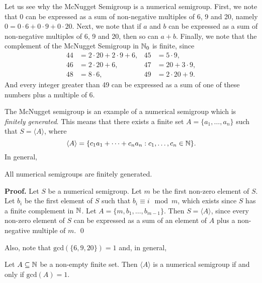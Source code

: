 Let us see why the McNugget Semigroup is a numerical semigroup. First, we note that $0$ can be expressed as a sum of non-negative multiples of 6, 9 and 20, namely $0 = 0 \cdot 6 + 0 \cdot 9 + 0 \cdot 20$. Next, we note that if $a$ and $b$ can be expressed as a sum of non-negative multiples of 6, 9 and 20, then so can $a + b$. Finally, we note that the complement of the McNugget Semigroup in $\mathbb{N}_0$ is finite, since 
\begin{align*}
    44 &= 2 \cdot 20 + 2 \cdot 9 + 6, &45 &= 5 \cdot 9,\\
    46 &= 2 \cdot 20 + 6, &47 &= 20 + 3 \cdot 9,\\
    48 &= 8 \cdot 6, & 49&= 2 \cdot 20 + 9. 
\end{align*}
And every integer greater than 49 can be expressed as a sum of one of these numbers plus a multiple of 6. \par
The McNugget semigroup is an example of a numerical semigroup which is \textit{finitely generated}. This means that there exists a finite set $A = \{a_1, \ldots, a_n\}$ such that $S = \langle A \rangle$, where 
\[\langle A \rangle = \{c_1a_1 + \cdots + c_na_n : c_1, \ldots, c_n \in \mathbb{N}\}.\]  
 In general,
\begin{theorem}\label{thm:smgps:fin_gen}
    All numerical semigroups are finitely generated.
\end{theorem}

\textbf{Proof. } Let $S$ be a numerical semigroup. Let $m$ be the first non-zero element of $S$. Let $b_i$ be the first element of $S$ such that \(b_i \equiv i \mod m\), which exists since $S$ has a finite complement in $\mathbb{N}$. Let $A = \{m, b_{1}, \ldots, b_{m - 1}\}$. Then $S = \langle A \rangle$, since every non-zero element of $S$ can be expressed as a sum of an element of $A$ plus a non-negative multiple of $m$. \qed \par

Also, note that $\text{gcd}(\{6, 9, 20\}) =  1$ and, in general,

\begin{theorem}\label{thm:smgps:gcd}
    Let $A \subseteq \mathbb{N}$ be a non-empty finite set. Then $\langle A \rangle$ is a numerical semigroup if and only if $\text{gcd}(A) = 1$.    
\end{theorem}

